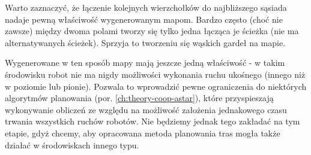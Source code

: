 Warto zaznaczyć, że łączenie kolejnych wierzchołków do najbliższego sąsiada nadaje pewną właściwość wygenerowanym mapom.
Bardzo często (choć nie zawsze) między dwoma polami tworzy się tylko jedna łącząca je ścieżka (nie ma alternatywanych ścieżek). Sprzyja to tworzeniu się wąskich gardeł na mapie.

Wygenerowane w ten sposób mapy mają jeszcze jedną właściwość - w takim środowisku robot nie ma nigdy możliwości wykonania ruchu ukośnego (innego niż w poziomie lub pionie). Pozwala to wprowadzić pewne ograniczenia do niektórych algorytmów planowania (por. \ref{ch:theory-coop-astar}), które przyspieszają wykonywanie obliczeń ze względu na możliwość założenia jednakowego czasu trwania wszystkich ruchów robotów. Nie będziemy jednak tego zakładać na tym etapie, gdyż chcemy, aby opracowana metoda planowania tras mogła także działać w środowiskach innego typu.

